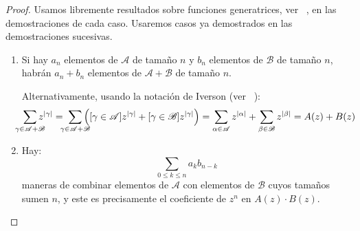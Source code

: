   \begin{proof}
    Usamos libremente resultados sobre funciones generatrices,
    ver~%
      \cite[capítulo~14]{brand17:_fundamentos_informatica},
    en las demostraciones de cada caso.
    Usaremos casos ya demostrados en las demostraciones sucesivas.
    \begin{enumerate}
    \item %
      Si hay \(a_n\) elementos de \(\mathscr{A}\) de tamaño \(n\)
      y \(b_n\) elementos de \(\mathscr{B}\) de tamaño \(n\),
      habrán \(a_n + b_n\) elementos
      de \(\mathscr{A} + \mathscr{B}\)
      de tamaño \(n\).

      Alternativamente,
      usando la notación de Iverson
      (ver~%
        \cite[sección~1.4]{brand17:_fundamentos_informatica}):
      \begin{equation*}
        \sum_{\mathclap{\gamma \in \mathscr{A} + \mathscr{B}}}
          z^{\lvert \gamma \rvert}
          = \; \sum_{\mathclap{\gamma \in \mathscr{A}
                                            + \mathscr{B}}}
                 \left(
                   [\gamma \in \mathscr{A}]
                     z^{\lvert \gamma \rvert}
                      + [\gamma \in \mathscr{B}]
                          z^{\lvert \gamma \rvert}
                 \right)
          = \sum_{\alpha \in \mathscr{A}} z^{\lvert \alpha \rvert}
              + \sum_{\beta \in \mathscr{B}}
                  z^{\lvert \beta \rvert}
          = A(z) + B(z)
      \end{equation*}
    \item %
      Hay:
      \begin{equation*}
        \sum_{0 \le k \le n} a_k b_{n - k}
      \end{equation*}
      maneras de combinar elementos de \(\mathscr{A}\)
      con elementos de \(\mathscr{B}\) cuyos tamaños sumen \(n\),
      y este es precisamente
      el coeficiente de \(z^n\) en \(A(z) \cdot B(z)\).


\end{enumerate}
\end{proof}
